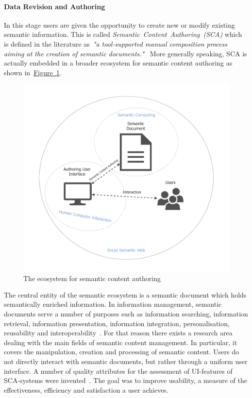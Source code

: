 \paragraph{Data Revision and Authoring} In this stage users are given the opportunity to create new or modify existing semantic information. 
This is called \textit{Semantic~Content~Authoring~(SCA)} which is defined in the literature as~\textit{"a tool-supported
manual composition process aiming at the creation of semantic documents."}~\cite{khalili2013} More generally speaking, SCA is actually embedded in a broader ecosystem for semantic content authoring as shown in~\hyperref[fig:authoring_semantic_ecosystem]{Figure~\ref*{fig:authoring_semantic_ecosystem}}. 
\begin{figure}
	 \centering
	 \includegraphics[width=1\textwidth]{drawio/authoring_semantic_ecosystem}
	 \caption{The ecosystem for semantic content authoring}\label{fig:authoring_semantic_ecosystem}
\end{figure}
The central entity of the semantic ecosystem is a semantic document which holds semantically enriched information. 
In information management, semantic documents serve a number of purposes such as information searching, information retrieval, information presentation, information integration, personalisation, reusability and interoperability~\cite{khalili2013}. For that reason there exists a research area dealing with the main fields of semantic content management. In particular, it covers the manipulation, creation and processing of semantic content. Users do not directly interact with semantic documents, but rather through a uniform user interface. A number of quality attributes for the assessment of UI-features of SCA-systems were invented~\cite{khalili2013}. The goal was to improve usability, a measure of the effectiveness, efficiency and satisfaction a user achieves. 

